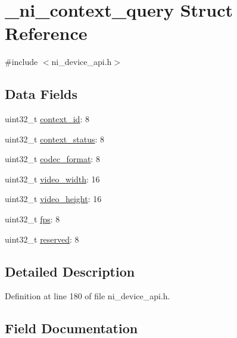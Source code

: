 \hypertarget{struct__ni__context__query}{}\section{\+\_\+ni\+\_\+context\+\_\+query Struct Reference}
\label{struct__ni__context__query}


{\ttfamily \#include $<$ni\+\_\+device\+\_\+api.\+h$>$}

\subsection*{Data Fields}
\begin{DoxyCompactItemize}
\item 
uint32\+\_\+t \mbox{\hyperlink{struct__ni__context__query_a01310ac31e1626aab8d73ec86158f340}{context\+\_\+id}}\+: 8
\item 
uint32\+\_\+t \mbox{\hyperlink{struct__ni__context__query_ad153b73c17173fc602b725f30d028903}{context\+\_\+status}}\+: 8
\item 
uint32\+\_\+t \mbox{\hyperlink{struct__ni__context__query_a6972a0220282afb0857578bfe45fc53a}{codec\+\_\+format}}\+: 8
\item 
uint32\+\_\+t \mbox{\hyperlink{struct__ni__context__query_a94c61f9d8155afb285177936e9fa30ce}{video\+\_\+width}}\+: 16
\item 
uint32\+\_\+t \mbox{\hyperlink{struct__ni__context__query_af65e7328fad30f40770959957538da7c}{video\+\_\+height}}\+: 16
\item 
uint32\+\_\+t \mbox{\hyperlink{struct__ni__context__query_a129745a75be674a0496ddd992bc3b22b}{fps}}\+: 8
\item 
uint32\+\_\+t \mbox{\hyperlink{struct__ni__context__query_aa43c4c21b173ada1b6b7568956f0d650}{reserved}}\+: 8
\end{DoxyCompactItemize}


\subsection{Detailed Description}


Definition at line 180 of file ni\+\_\+device\+\_\+api.\+h.



\subsection{Field Documentation}
\mbox{\label{struct__ni__context__query_a6972a0220282afb0857578bfe45fc53a}} 
